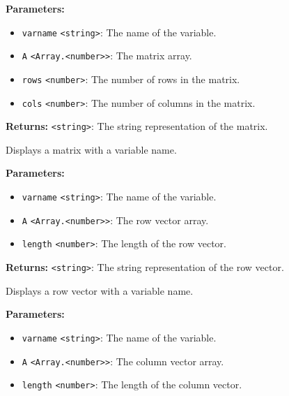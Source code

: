 \documentclass[12pt,a4paper]{article}
\begin{document}
\noindent \textbf{Parameters:}
\begin{itemize}
  \item \texttt{varname} \texttt{<string>}: The name of the variable.
  \item \texttt{A} \texttt{<Array.<number>>}: The matrix array.
  \item \texttt{rows} \texttt{<number>}: The number of rows in the matrix.
  \item \texttt{cols} \texttt{<number>}: The number of columns in the matrix.
\end{itemize}

\noindent \textbf{Returns:} \texttt{<string>}: The string representation of the matrix.

\noindent Displays a matrix with a variable name.

\vspace{5mm}
\noindent {}


\noindent \textbf{Parameters:}
\begin{itemize}
  \item \texttt{varname} \texttt{<string>}: The name of the variable.
  \item \texttt{A} \texttt{<Array.<number>>}: The row vector array.
  \item \texttt{length} \texttt{<number>}: The length of the row vector.
\end{itemize}

\noindent \textbf{Returns:} \texttt{<string>}: The string representation of the row vector.

\noindent Displays a row vector with a variable name.

\vspace{5mm}
\noindent {}


\noindent \textbf{Parameters:}
\begin{itemize}
  \item \texttt{varname} \texttt{<string>}: The name of the variable.
  \item \texttt{A} \texttt{<Array.<number>>}: The column vector array.
  \item \texttt{length} \texttt{<number>}: The length of the column vector.
\end{itemize}
\end{document}

